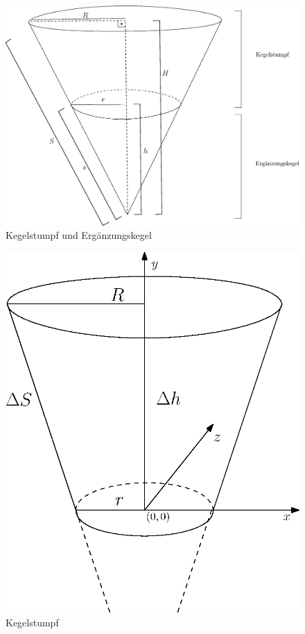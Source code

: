 \begin{figure}[!htb]
	\centering
	\includegraphics[scale=.5]{images/fullCone3.eps}
	\caption{Kegelstumpf und Ergänzungskegel}
	\label{fig:coneWithFrustum}
\end{figure}

\begin{figure}[!htb]
	\centering
	\includegraphics[scale=.7]{images/coneFrustum.eps}
	\caption{Kegelstumpf}
	\label{fig:coneFrustum}
\end{figure}

